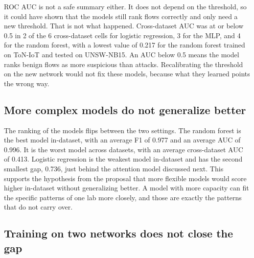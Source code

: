 ROC AUC is not a safe summary either. It does not depend on the threshold, so it could have shown that the models still rank flows correctly and only need a new threshold. That is not what happened. Cross-dataset AUC was at or below 0.5 in 2 of the 6 cross-dataset cells for logistic regression, 3 for the MLP, and 4 for the random forest, with a lowest value of 0.217 for the random forest trained on ToN-IoT and tested on UNSW-NB15. An AUC below 0.5 means the model ranks benign flows as more suspicious than attacks. Recalibrating the threshold on the new network would not fix these models, because what they learned points the wrong way.

\subsection{More complex models do not generalize better}

The ranking of the models flips between the two settings. The random forest is the best model in-dataset, with an average F1 of 0.977 and an average AUC of 0.996. It is the worst model across datasets, with an average cross-dataset AUC of 0.413. Logistic regression is the weakest model in-dataset and has the second smallest gap, 0.736, just behind the attention model discussed next. This supports the hypothesis from the proposal that more flexible models would score higher in-dataset without generalizing better. A model with more capacity can fit the specific patterns of one lab more closely, and those are exactly the patterns that do not carry over.

\ATTNPARA

\subsection{Training on two networks does not close the gap}

\begin{table}[t]
\centering
\small
{}
\caption{Attack-class F1 on a held-out dataset. One source is the average F1 of the two single-source models trained on the other datasets. Two sources is the model trained on both of those datasets combined. \MULTICAPTION}
\label{tab:multi}
\end{table}

